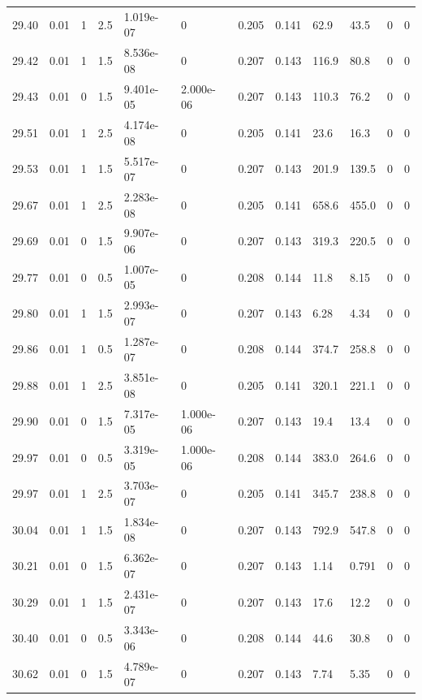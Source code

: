 \documentclass[preview]{standalone}
\begin{document}
{{{{{{{{{\begin{tabular}{L{1.2cm}C{1.2cm} C{0.3cm}C{0.5cm} C{1.4cm}C{1.4cm} C{1.4cm}C{1.4cm} C{1.6cm}C{1.6cm} C{1.6cm}C{1.6cm}}
  29.40  &  0.01  & 1     & 2.5 &  1.019e-07  & 0  &  0.205&   0.141& 62.9 & 43.5   &  0 & 0  \\ 
  29.42  &  0.01  & 1     & 1.5 &  8.536e-08  & 0  &  0.207&   0.143& 116.9 & 80.8   &  0 & 0  \\ 
  29.43  &  0.01  & 0     & 1.5 &  9.401e-05  & 2.000e-06  &  0.207&   0.143& 110.3 & 76.2   &  0 & 0  \\ 
  29.51  &  0.01  & 1     & 2.5 &  4.174e-08  & 0  &  0.205&   0.141& 23.6 & 16.3   &  0 & 0  \\ 
  29.53  &  0.01  & 1     & 1.5 &  5.517e-07  & 0  &  0.207&   0.143& 201.9 & 139.5   &  0 & 0  \\ 
  29.67  &  0.01  & 1     & 2.5 &  2.283e-08  & 0  &  0.205&   0.141& 658.6 & 455.0   &  0 & 0  \\ 
  29.69  &  0.01  & 0     & 1.5 &  9.907e-06  & 0  &  0.207&   0.143& 319.3 & 220.5   &  0 & 0  \\ 
  29.77  &  0.01  & 0     & 0.5 &  1.007e-05  & 0  &  0.208&   0.144& 11.8 & 8.15   &  0 & 0  \\ 
  29.80  &  0.01  & 1     & 1.5 &  2.993e-07  & 0  &  0.207&   0.143& 6.28 & 4.34   &  0 & 0  \\ 
  29.86  &  0.01  & 1     & 0.5 &  1.287e-07  & 0  &  0.208&   0.144& 374.7 & 258.8   &  0 & 0  \\ 
  29.88  &  0.01  & 1     & 2.5 &  3.851e-08  & 0  &  0.205&   0.141& 320.1 & 221.1   &  0 & 0  \\ 
  29.90  &  0.01  & 0     & 1.5 &  7.317e-05  & 1.000e-06  &  0.207&   0.143& 19.4 & 13.4   &  0 & 0  \\ 
  29.97  &  0.01  & 0     & 0.5 &  3.319e-05  & 1.000e-06  &  0.208&   0.144& 383.0 & 264.6   &  0 & 0  \\ 
  29.97  &  0.01  & 1     & 2.5 &  3.703e-07  & 0  &  0.205&   0.141& 345.7 & 238.8   &  0 & 0  \\ 
  30.04  &  0.01  & 1     & 1.5 &  1.834e-08  & 0  &  0.207&   0.143& 792.9 & 547.8   &  0 & 0  \\ 
  30.21  &  0.01  & 0     & 1.5 &  6.362e-07  & 0  &  0.207&   0.143& 1.14 & 0.791   &  0 & 0  \\ 
  30.29  &  0.01  & 1     & 1.5 &  2.431e-07  & 0  &  0.207&   0.143& 17.6 & 12.2   &  0 & 0  \\ 
  30.40  &  0.01  & 0     & 0.5 &  3.343e-06  & 0  &  0.208&   0.144& 44.6 & 30.8   &  0 & 0  \\ 
  30.62  &  0.01  & 0     & 1.5 &  4.789e-07  & 0  &  0.207&   0.143& 7.74 & 5.35   &  0 & 0  \\ 

\end{tabular}}}}}}}}}}
\end{document}
